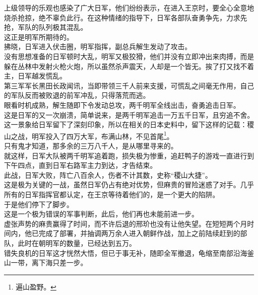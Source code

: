 \begin{multicols}{\theparacolNo}
上级领导的乐观也感染了广大日军，他们纷纷表示，在进入王京时，要全心全意地烧杀抢掠，绝不辜负此行。在这种情绪的指导下，日军各部队奋勇争先，力求先抢，军队的队列极其混乱。\\

这正是明军所期待的。\\

拂晓，日军进入伏击圈，明军指挥，副总兵解生发动了攻击。\\

没有思想准备的日军顿时大乱，明军又极狡猾，他们并没有立即冲出来肉搏，而是躲在丛林中发射火枪火炮，所以虽然杀声震天，人却是一个皆无。挨了打又找不着主，日军越发慌乱。\\

第三军军长黑田长政闻讯，当即带领三千人前来支援，可慌乱之间毫无作用，自己的军队反而被败退的前军冲乱，只得落荒而逃。\\

眼看时机成熟，解生随即下令发动总攻，两千明军全线出击，奋勇追击日军。\\

这是日军的又一次崩溃，简单说来，是两千明军追击一万五千日军，且穷追不舍。这一景象给日军留下了深刻印象，所以在相关的日本史料中，留下这样的记载：稷山之战，明军投入了四万大军，布满山林，不见首尾\footnote{遍山盈野。}。\\

只有鬼才知道，那多余的三万八千人，是从哪里寻来的。\\

就这样，日军大队被两千明军追着跑，损失极为惨重，追赶鸭子的游戏一直进行到下午四点，直到日军右路军主力到达，才告结束。\\

此战，日军大败，阵亡八百余人，伤者不计其数，史称“稷山大捷”。\\

这是极为关键的一战，虽然日军仍占有绝对优势，但麻贵的冒险迷惑了对手。几乎所有的日军指挥官都认定，在王京等待着他们的，是一个更大的陷阱。\\

于是他们停下了脚步。\\

这是一个极为错误的军事判断，此后，他们再也未能前进一步。\\

虚张声势的麻贵赢得了时间，而不许后退的邢玠也没有让他失望。在短短两个月时间内，他已完成了部署，并抽调两万余人进入朝鲜作战，加上之前陆续赶到的部队，此时在朝明军的数量，已经达到五万。\\

错失良机的日军这才恍然大悟，但已于事无补，随即全军撤退，龟缩至南部沿海釜山一带，离下海只差一步。\\


\end{multicols}
